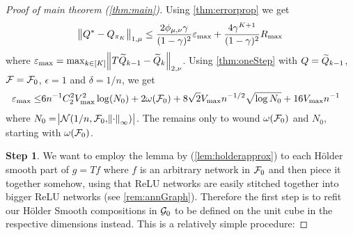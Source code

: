 
\begin{proof}[Proof of main theorem (\ref{thm:main})] %
  Using \cref{thm:errorprop} we get
  \begin{equation}
    \norm{Q^* - Q_{\pi_K}}_{1,\mu} \leq
    \frac{2 \phi_{\mu, \nu} \gamma}{(1-\gamma)^2}\varepsilon_{\max} +
    \frac{4 \gamma^{K+1}}{(1-\gamma)^2} R_{\max}
    \label{eq:mp1}
  \end{equation}
  where $\varepsilon_{\max} =
  \max_{k \in [K]} \norm{T \widetilde{Q}_{k-1} - \widetilde{Q}_k}_{2, \nu}$.
  Using \cref{thm:oneStep} with $Q = \widetilde{Q}_{k-1}$,
  $\mathcal{F} = \mathcal{F}_0$, $\epsilon = 1$ and $\delta = 1/n$, we get
  \begin{align}
    \varepsilon_{\max} \leq & 6 n^{-1} C_2^2 V_{\max}^2 \log(N_0)
    + 2 \omega(\mathcal{F}_0)
    + 8 \sqrt{2} V_{\max} n^{-1/2} \sqrt{\log N_0}
    + 16 V_{\max} n^{-1}
    \label{eq:mp2}
  \end{align}
  where $N_0 = \abs{\mathcal{N}(1/n, \mathcal{F}_0, \norm{\cdot}_\infty)}$.
  The remains only to wound $\omega(\mathcal{F}_0)$ and $N_0$,
  starting with $\omega(\mathcal{F}_0)$.

  \textbf{Step 1}.
  We want to employ the lemma by 
  (\cref{lem:holderapprox})
  to each Hölder smooth part of $g = Tf$ where $f$ is an arbitrary network
  in $\mathcal{F}_0$
  and then piece it together somehow,
  using that ReLU networks are easily stitched together into bigger
  ReLU networks (see \cref{rem:annGraph}).
  Therefore the first step is to refit our
  Hölder Smooth compositions in $\mathcal{G}_0$ to be defined on the unit cube in
  the respective dimensions instead.
  This is a relatively simple procedure:


\end{proof}
